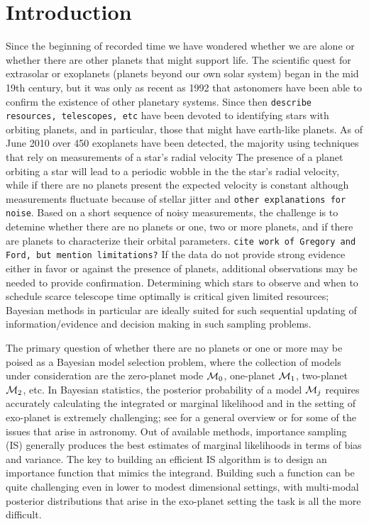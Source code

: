 \section{Introduction}

Since the beginning of recorded time we have wondered whether we are
alone or whether there are other planets that might support life. The
scientific quest for extrasolar or exoplanets (planets beyond our own
solar system) began in the mid 19th century, but it was only as recent
as 1992 that astonomers have been able to confirm the existence of
other planetary systems.  Since then {\tt describe resources,
  telescopes, etc} have been devoted to identifying stars with
orbiting planets, and in particular, those that might have earth-like
planets. As of June 2010 over 450 exoplanets have been detected, the
majority using techniques that rely on measurements of a star's radial
velocity The presence of a planet orbiting a star will lead to a
periodic wobble in the the star's radial velocity, while if there are
no planets present the expected velocity is constant although
measurements fluctuate because of stellar jitter and {\tt other
  explanations for noise}.  Based on a short sequence of noisy
measurements, the challenge is to detemine whether there are no
planets or one, two or more planets, and if there are planets to
characterize their orbital parameters.  {\tt cite work of Gregory and
  Ford, but mention limitations?}  If the data do not provide strong
evidence either in favor or against the presence of planets,
additional observations may be needed to provide confirmation.
Determining which stars to observe and when to schedule scarce
telescope time optimally is critical given limited resources; Bayesian methods in particular
are ideally suited for such sequential updating of
information/evidence and decision making in such sampling problems.


The primary question of whether there are no planets or one or more
may be poised as a Bayesian model selection problem, where the
collection of models under consideration are the zero-planet mode
${\cal{M}}_0$, one-planet ${\cal{M}}_1$, two-planet ${\cal{M}}_2$, etc.  In Bayesian
statistics, the posterior probability of a model ${\cal{M}}_j$ requires
accurately calculating the integrated or marginal likelihood and in
the setting of exo-planet is extremely challenging; see
\citet{Clyd:Geor:2004} for a general overview or \cite{Clyd:etal:2005}
for some of the issues that arise in astronomy. Out of available
methods, importance sampling (IS) generally produces the best
estimates of marginal likelihoods in terms of bias and variance. The
key to building an efficient IS algorithm is to design an importance
function that mimics the integrand.  Building such a function can be
quite challenging even in lower to modest dimensional settings, with
multi-modal posterior distributions that arise in the exo-planet
setting the task is all the more difficult. 

